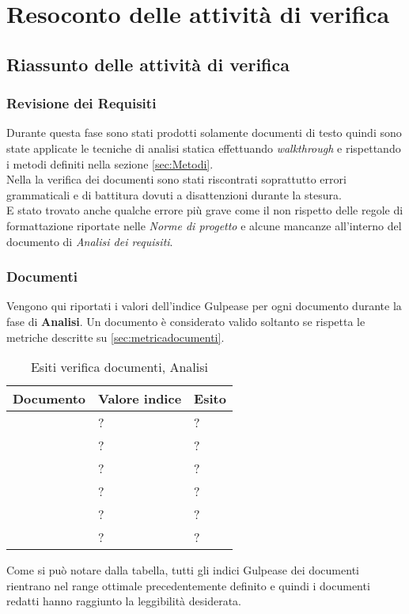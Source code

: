 \section{Resoconto delle attività di verifica}
\subsection{Riassunto delle attività di verifica}
\subsubsection{Revisione dei Requisiti}

Durante questa fase sono stati prodotti solamente documenti di testo quindi sono state applicate le tecniche di analisi statica effettuando \textit{walkthrough} e rispettando i metodi definiti nella sezione \ref{sec:Metodi}.\\
Nella la verifica dei documenti sono stati riscontrati soprattutto errori grammaticali e di battitura dovuti a disattenzioni durante la stesura.\\
E stato trovato anche qualche errore più grave come il non rispetto delle regole di formattazione riportate nelle \textit{Norme di progetto} e alcune mancanze all'interno del documento di \textit{Analisi dei requisiti}.\\

\subsubsection{Documenti}

Vengono qui riportati i valori dell’indice Gulpease per ogni documento durante la fase di \textbf{Analisi}. Un documento è considerato valido soltanto se rispetta le metriche descritte su \ref{sec:metricadocumenti}.

\begin{table}[H]
	\centering
	\begin{tabular}{p{}p{}
			p{}}
		\toprule Documento & Valore indice & Esito \\
		\midrule
		\PianoDiProgetto & ? & ? \\
		\AnalisiDeiRequisiti & ? & ? \\
		\NormeDiProgetto & ? & ? \\
		\PianoDiQualifica & ? & ? \\
		\StudioDiFattibilita & ? & ? \\
		\Glossario & ? & ? \\
		\bottomrule
	\end{tabular}
	\label{tab:costorequisiti}
	\caption{Esiti verifica documenti, Analisi}
\end{table}

Come si può notare dalla tabella, tutti gli indici Gulpease dei documenti rientrano nel range ottimale precedentemente definito e quindi i documenti redatti hanno raggiunto la leggibilità desiderata.
